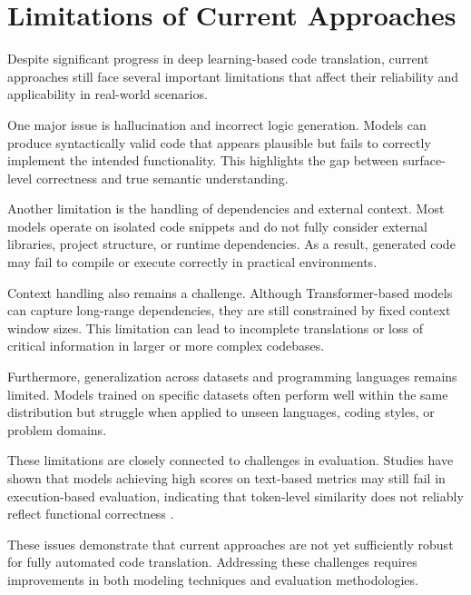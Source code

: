 \section{Limitations of Current Approaches}


Despite significant progress in deep learning-based code translation, current
approaches still face several important limitations that affect their
reliability and applicability in real-world scenarios.

One major issue is hallucination and incorrect logic generation. Models can
produce syntactically valid code that appears plausible but fails to correctly
implement the intended functionality. This highlights the gap between
surface-level correctness and true semantic understanding.

Another limitation is the handling of dependencies and external context. Most
models operate on isolated code snippets and do not fully consider external
libraries, project structure, or runtime dependencies. As a result, generated
code may fail to compile or execute correctly in practical environments.

Context handling also remains a challenge. Although Transformer-based models can
capture long-range dependencies, they are still constrained by fixed context
window sizes. This limitation can lead to incomplete translations or loss of
critical information in larger or more complex codebases.

Furthermore, generalization across datasets and programming languages remains
limited. Models trained on specific datasets often perform well within the same
distribution but struggle when applied to unseen languages, coding styles, or
problem domains.

These limitations are closely connected to challenges in evaluation. Studies
have shown that models achieving high scores on text-based metrics may still
fail in execution-based evaluation, indicating that token-level similarity does
not reliably reflect functional correctness \cite{huang2022exeds}.

These issues demonstrate that current approaches are not yet sufficiently robust
for fully automated code translation. Addressing these challenges requires
improvements in both modeling techniques and evaluation methodologies.